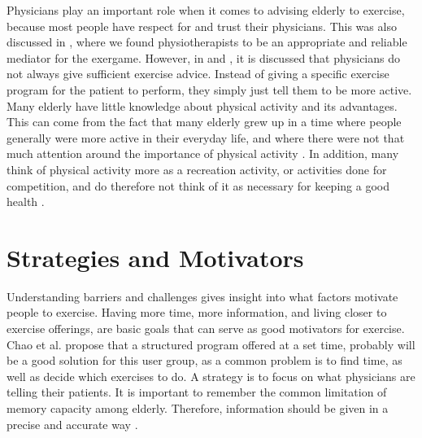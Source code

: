 Physicians play an important role when it comes to advising elderly to exercise, because most people have respect for and trust their physicians. This was also discussed in \cite{project}, where we found physiotherapists to be an appropriate and reliable mediator for the exergame. However, in \cite{schutzer} and \cite{chao}, it is discussed that physicians do not always give sufficient exercise advice. Instead of giving a specific exercise program for the patient to perform, they simply just tell them to be more active. Many elderly have little knowledge about physical activity and its advantages. This can come from the fact that many elderly grew up in a time where people generally were more active in their everyday life, and where there were not that much attention around the importance of physical activity \cite{schutzer}. In addition, many think of physical activity more as a recreation activity, or activities done for competition, and do therefore not think of it as necessary for keeping a good health \cite{chao}.  

\section{Strategies and Motivators}
\label{sec:motivators}
Understanding barriers and challenges gives insight into what factors motivate people to exercise. Having more time, more information, and living closer to exercise offerings, are basic goals that can serve as good motivators for exercise. Chao et al. \cite{chao} propose that a structured program offered at a set time, probably will be a good solution for this user group, as a common problem is to find time, as well as decide which exercises to do. A strategy is to focus on what physicians are telling their patients. It is important to remember the common limitation of memory capacity among elderly. Therefore, information should be given in a precise and accurate way \cite{chao}.  

